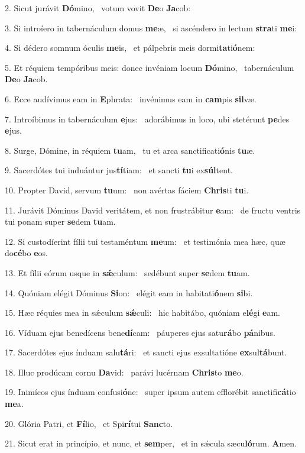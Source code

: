 2. Sicut jurávit \textbf{Dó}mino, \ast\  votum vovit \textbf{De}o \textbf{Ja}cob:\

3. Si introíero in tabernáculum domus \textbf{me}æ, \ast\  si ascéndero in lectum \textbf{stra}ti \textbf{me}i:\

4. Si dédero somnum óculis \textbf{me}is, \ast\  et pálpebris meis dormi\textbf{ta}ti\textbf{ó}nem:\

5. Et réquiem tempóribus meis: donec invéniam locum \textbf{Dó}mino, \ast\  tabernáculum \textbf{De}o \textbf{Ja}cob.\

6. Ecce audívimus eam in \textbf{E}phrata: \ast\  invénimus eam in \textbf{cam}pis \textbf{sil}væ.\

7. Introíbimus in tabernáculum \textbf{e}jus: \ast\  adorábimus in loco, ubi stetérunt \textbf{pe}des \textbf{e}jus.\

8. Surge, Dómine, in réquiem \textbf{tu}am, \ast\  tu et arca sanctificati\textbf{ó}nis \textbf{tu}æ.\

9. Sacerdótes tui induántur jus\textbf{tí}tiam: \ast\  et sancti \textbf{tu}i ex\textbf{súl}tent.\

10. Propter David, servum \textbf{tu}um: \ast\  non avértas fáciem \textbf{Chris}ti \textbf{tu}i.\

11. Jurávit Dóminus David veritátem, et non frustrábitur \textbf{e}am: \ast\  de fructu ventris tui ponam super \textbf{se}dem \textbf{tu}am.\

12. Si custodíerint fílii tui testaméntum \textbf{me}um: \ast\  et testimónia mea hæc, quæ do\textbf{cé}bo \textbf{e}os.\

13. Et fílii eórum usque in \textbf{sǽ}culum: \ast\  sedébunt super \textbf{se}dem \textbf{tu}am.\

14. Quóniam elégit Dóminus \textbf{Si}on: \ast\  elégit eam in habitati\textbf{ó}nem \textbf{si}bi.\

15. Hæc réquies mea in sǽculum \textbf{sǽ}culi: \ast\  hic habitábo, quóniam e\textbf{lé}gi \textbf{e}am.\

16. Víduam ejus benedícens bene\textbf{dí}cam: \ast\  páuperes ejus satu\textbf{rá}bo \textbf{pá}nibus.\

17. Sacerdótes ejus índuam salu\textbf{tá}ri: \ast\  et sancti ejus exsultatióne \textbf{ex}sul\textbf{tá}bunt.\

18. Illuc prodúcam cornu \textbf{Da}vid: \ast\  parávi lucérnam \textbf{Chris}to \textbf{me}o.\

19. Inimícos ejus índuam confusi\textbf{ó}ne: \ast\  super ipsum autem efflorébit sanctifi\textbf{cá}tio \textbf{me}a.\

20. Glória Patri, et \textbf{Fí}lio, \ast\  et Spi\textbf{rí}tui \textbf{Sanc}to.\

21. Sicut erat in princípio, et nunc, et \textbf{sem}per, \ast\  et in sǽcula sæcu\textbf{ló}rum. \textbf{A}men.\

